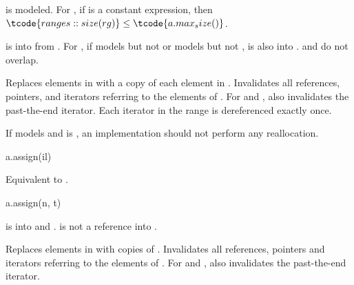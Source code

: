 \begin{itemdescr}
\pnum
\result
{}

\pnum
\mandates
{}
is modeled.
For ,
if  is a constant expression,
then $\tcode{ranges::size(rg)} \le \tcode{a.max_size()}$.

\pnum
\expects
{} is  into 
from .
For ,
if  models
but not  or models
but not ,
 is also  into .
 and  do not overlap.

\pnum
\effects
Replaces elements in  with a copy of each element in .
Invalidates all references, pointers, and iterators
referring to the elements of .
For  and ,
also invalidates the past-the-end iterator.
Each iterator in the range  is dereferenced exactly once.

\pnum
\recommended
If  models  and
 is ,
an implementation should not perform any reallocation.
\end{itemdescr}

\begin{itemdecl}
a.assign(il)
\end{itemdecl}

\begin{itemdescr}
\pnum
\effects
Equivalent to .
\end{itemdescr}

\begin{itemdecl}
a.assign(n, t)
\end{itemdecl}

\begin{itemdescr}
\pnum
\result
{}

\pnum
\expects
{} is  into 
and .
 is not a reference into .

\pnum
\effects
Replaces elements in  with  copies of .
Invalidates all references, pointers and iterators
referring to the elements of .
For  and ,
also invalidates the past-the-end iterator.
\end{itemdescr}

